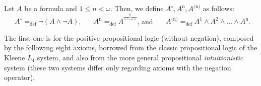 \documentclass{llncs}
\begin{document}
\begin{definition}\label{defn:daCosta(n)} Let $A$ be a formula and $1 \leq n < \omega$.
Then, we define $A^\circ, A^{\text{n}}, A^{\text{(n)}}$ as
follows:\\
\noindent \ \ \ $A^\circ  =_{\text{def}} \neg (A \land \neg A)$,
\noindent \ \ \ $A^{\text{n}} =_{\text{def}}
A^{\overbrace{\circ\!\circ\!\cdots\!\circ}^n}$, and \noindent \ \ \
$A^{\text{(n)}} =_{\text{def}} A^1 \land A^2 \land \dots \land
A^{\text{n}}$.
\end{definition}
The first one is for the positive propositional logic (without
negation), composed by the following eight axioms, borrowed from the
 classic propositional logic of the
Kleene $L_4$ system, and also from the more general propositional
\emph{intuitionistic} system (these two systems differ only
regarding axioms with the negation operator),
\end{document}
